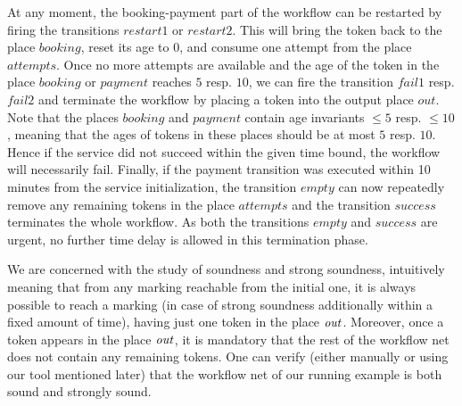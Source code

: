 At any moment, the booking-payment part of the workflow can be
restarted by firing the transitions $\mathit{restart1}$ or
$\mathit{restart2}$. This will bring the token back to the place
$\mathit{booking}$, reset its age to $0$, and consume one attempt from
the place $\mathit{attempts}$. Once no more attempts are available
and the age of the token in the place $\mathit{booking}$ or
$\mathit{payment}$ reaches $5$ resp. $10$, we can fire
the transition $\mathit{fail1}$ resp. $\mathit{fail2}$ and terminate the
workflow by placing a token into the output place $\mathit{out}$.
Note that the places $\mathit{booking}$ and $\mathit{payment}$ contain
age invariants $\leq 5$ resp. $\leq 10$, meaning that the ages of tokens in 
these places should be at most $5$ resp. $10$. Hence if the service
did not succeed within the given time bound, the workflow will necessarily
fail.
Finally, if the payment transition was executed within 10 minutes
from the service initialization, the transition
$\mathit{empty}$ can now repeatedly remove any remaining tokens in the place
$\mathit{attempts}$ and the transition $\mathit{success}$ terminates 
the whole workflow. As both the transitions
$\mathit{empty}$ and $\mathit{success}$ are urgent, no further time delay
is allowed in this termination phase.

We are concerned with the study of
soundness and strong soundness, intuitively meaning that from any
marking reachable from the initial one, it is always possible
to reach a marking (in case of strong soundness additionally within a fixed
amount of time), having just one token in the place ${\mathit{out}}$.
Moreover, once a token appears in the place ${\mathit{out}}$, it is mandatory
that the rest of the workflow net does not contain any remaining tokens.
One can verify (either manually or using our tool mentioned later)
that the workflow net of our running example is both sound and strongly sound.

